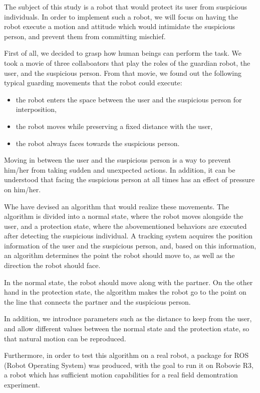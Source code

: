 \documentclass{kuisthesis}
\begin{document}
\begin{eabstract}
	The subject of this study is a robot that would protect its user from suspicious individuals.
	In order to implement such a robot, we will focus on having the robot execute a motion and attitude which would intimidate the suspicious person, and prevent them from committing mischief.

	First of all, we decided to grasp how human beings can perform the task. We took a movie of three collaboators that play the roles of the guardian robot, the user, and the suspicious person. From that movie, we found out the following typical guarding movements that the robot could execute:

	\begin{itemize}
	\item the robot enters the space between the user and the suspicious person for interposition,
	\item the robot moves while preserving a fixed distance with the user,
	\item the robot always faces towards the suspicious person.
	\end{itemize}

	Moving in between the user and the suspicious person is a way to prevent him/her from taking sudden and unexpected actions. In addition, it can be understood that facing the suspicious person at all times has an effect of pressure on him/her.

	Whe have devised an algorithm that would realize these movements. The algorithm is divided into a normal state, where the robot moves alongside the user, and a protection state, where the abovementioned behaviors are executed after detecting the suspicious individual. A tracking system acquires the position information of the user and the suspicious person, and, based on this information, an algorithm determines the point the robot should move to, as well as the direction the robot should face.

	In the normal state, the robot should move along with the partner. On the other hand in the protection state, the algorithm makes the robot go to the point on the line that connects the partner and the suspicious person.

	In addition, we introduce parameters such as the distance to keep from the user, and allow different values between the normal state and the protection state, so that natural motion can be reproduced.

	Furthermore, in order to test this algorithm on a real robot, a package for ROS (Robot Operating System) was produced, with the goal to run it on Robovie R3, a robot which has sufficient motion capabilities for a real field demontration experiment.


\end{eabstract}
\end{document}
